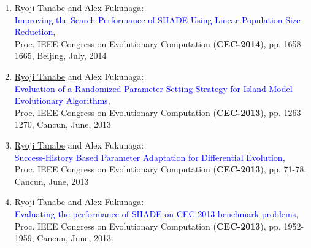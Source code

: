 \documentclass[letterpaper]{article}
\begin{document}
\begin{enumerate}
\item \underline{Ryoji Tanabe} and Alex Fukunaga: \\\textcolor{blue}{Improving the Search Performance of SHADE Using Linear Population Size Reduction},\\ Proc. IEEE Congress on Evolutionary Computation ({\bf CEC-2014}),  pp. 1658-1665, Beijing, July, 2014
\item \underline{Ryoji Tanabe} and Alex Fukunaga:\\ \textcolor{blue}{Evaluation of a Randomized Parameter Setting Strategy for Island-Model Evolutionary Algorithms}, \\Proc. IEEE Congress on Evolutionary Computation ({\bf CEC-2013}), pp. 1263-1270, Cancun, June, 2013
\item \underline{Ryoji Tanabe} and Alex Fukunaga:\\ \textcolor{blue}{Success-History Based Parameter Adaptation for Differential Evolution}, \\Proc. IEEE Congress on Evolutionary Computation ({\bf CEC-2013}), pp. 71-78, Cancun, June, 2013
\item \underline{Ryoji Tanabe} and Alex Fukunaga:\\ \textcolor{blue}{Evaluating the performance of SHADE on CEC 2013 benchmark problems}, \\Proc. IEEE Congress on Evolutionary Computation ({\bf CEC-2013}), pp. 1952-1959, Cancun, June, 2013.
\end{enumerate}






\end{document}
